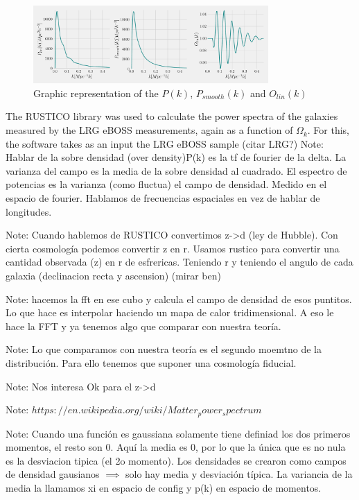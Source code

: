 \begin{figure}[t]
	\centering
	\includegraphics[width=0.8\textwidth]{../figs/PkOlPsm.pdf}
	\caption{Graphic representation of the $P(k)$, $P_{smooth}(k)$ and $O_{lin}(k)$}
	\label{fig:PkOlPsm}
\end{figure}

The RUSTICO library was used to calculate the power spectra of the galaxies measured by the LRG eBOSS measurements, again as a function of $\Omega_k$. For this, the software takes as an input the LRG eBOSS sample (citar LRG?) 
Note: Hablar de la sobre densidad (over density)P(k) es la tf de fourier de la delta. La varianza del campo es la media de la sobre densidad al cuadrado. El espectro de potencias es la varianza (como fluctua) el campo de densidad. Medido en el espacio de fourier. Hablamos de  frecuencias espaciales en vez de hablar de longitudes.

Note: Cuando hablemos de RUSTICO convertimos z->d (ley de Hubble). Con cierta cosmología podemos convertir z en r. Usamos rustico para convertir una cantidad observada (z) en r de esfrericas. Teniendo r y teniendo el angulo de cada galaxia (declinacion recta y ascension) (mirar ben) 

Note: hacemos la fft en ese cubo y calcula el campo de densidad de esos puntitos. Lo que hace es interpolar haciendo un mapa de calor tridimensional. A eso le hace la FFT y ya tenemos algo que comparar con nuestra teoría.

Note: Lo que comparamos con nuestra teoría es el segundo moemtno de la distribución. Para ello tenemos que suponer una cosmología fiducial. 

Note: Nos interesa Ok para el z->d

Note: $https://en.wikipedia.org/wiki/Matter_power_spectrum$

Note: Cuando una función es gaussiana solamente tiene definiad los dos primeros momentos, el resto son 0. Aquí la media es 0, por lo que la única que es no nula es la desviacion tipica (el 2o momento). Los densidades se crearon como campos de densidad gausianos $\implies$ solo hay media y desviación típica. La variancia de la media la llamamos xi en espacio de config y p(k) en espacio de momentos. 
